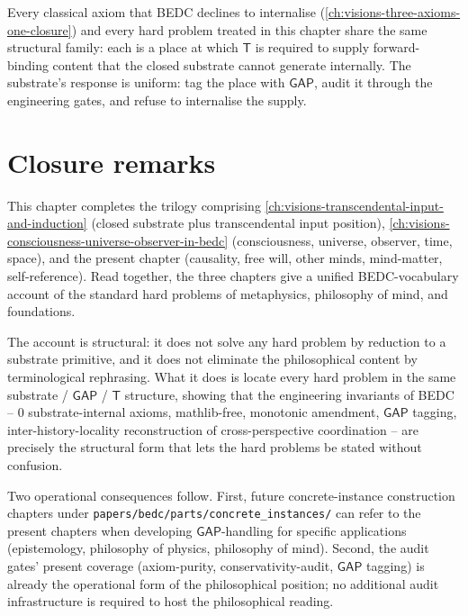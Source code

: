 \begin{principle}
\label{prin:hard-problems-shared-T-socket}
Every classical axiom that BEDC declines to internalise (\autoref{ch:visions-three-axioms-one-closure}) and every hard problem treated in this chapter share the same structural family: each is a place at which $\mathsf{T}$ is required to supply forward-binding content that the closed substrate cannot generate internally. The substrate's response is uniform: tag the place with $\mathsf{GAP}$, audit it through the engineering gates, and refuse to internalise the supply.
\end{principle}

\section{Closure remarks}
\label{sec:hard-problems-closure}

This chapter completes the trilogy comprising \autoref{ch:visions-transcendental-input-and-induction} (closed substrate plus transcendental input position), \autoref{ch:visions-consciousness-universe-observer-in-bedc} (consciousness, universe, observer, time, space), and the present chapter (causality, free will, other minds, mind-matter, self-reference). Read together, the three chapters give a unified BEDC-vocabulary account of the standard hard problems of metaphysics, philosophy of mind, and foundations.

The account is structural: it does not solve any hard problem by reduction to a substrate primitive, and it does not eliminate the philosophical content by terminological rephrasing. What it does is locate every hard problem in the same substrate / $\mathsf{GAP}$ / $\mathsf{T}$ structure, showing that the engineering invariants of BEDC -- 0 substrate-internal axioms, mathlib-free, monotonic amendment, $\mathsf{GAP}$ tagging, inter-history-locality reconstruction of cross-perspective coordination -- are precisely the structural form that lets the hard problems be stated without confusion.

Two operational consequences follow. First, future concrete-instance construction chapters under \texttt{papers/bedc/parts/concrete\_instances/} can refer to the present chapters when developing $\mathsf{GAP}$-handling for specific applications (epistemology, philosophy of physics, philosophy of mind). Second, the audit gates' present coverage (axiom-purity, conservativity-audit, $\mathsf{GAP}$ tagging) is already the operational form of the philosophical position; no additional audit infrastructure is required to host the philosophical reading.
